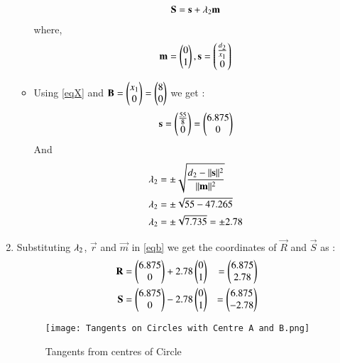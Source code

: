 \documentclass[journal,12pt,twocolumn]{IEEEtran}
\begin{document}
\begin{enumerate}
\begin{itemize}
\begin{align}
 \vec{S}=\vec{s}+\lambda\textsubscript{2} \vec{m}   \label{eqb}
\end{align}
where,
\begin{align}
 \vec{m}=\myvec{0\\1},\vec{s}=\myvec{\frac{d\textsubscript{2}}{x\textsubscript{1}}\\0}
 \end{align}
 \item Using \eqref{eqX} and $\vec{B}=\myvec{x\textsubscript{1}\\0}=\myvec{8\\0}$ we get :
 \begin{align}
 \vec{s}=\myvec{\frac{55}{8}\\0}=\myvec{6.875\\0}
\end{align}
And
\begin{align}
\lambda\textsubscript{2} &= \pm\sqrt{\frac {d\textsubscript{2}-\norm{\vec{s}}^2}{\norm{\vec{m}}^2}}
\\
\lambda\textsubscript{2} &= \pm\sqrt{55-47.265}
\\
\lambda\textsubscript{2} &= \pm\sqrt{7.735}=\pm 2.78
\end{align}
\end{itemize}
\item Substituting $\lambda\textsubscript{2}$, $\vec{r}$ and $\vec{m}$ in \eqref{eqb} we get the coordinates of $\vec{R}$ and  $\vec{S}$ as :
\begin{align}
\vec{R}&=\myvec{6.875\\0}+ 2.78\myvec{0\\1}&=\myvec{6.875\\2.78}
\\
\vec{S}&=\myvec{6.875\\0}- 2.78\myvec{0\\1}&=\myvec{6.875\\-2.78}
\end{align}




\begin{figure}[H]
\centering
\texttt{[image: Tangents on Circles with Centre A and B.png]}
\caption{Tangents from centres of Circle}
\label{fig:circle}	
\end{figure}
\end{enumerate}
\end{document}
